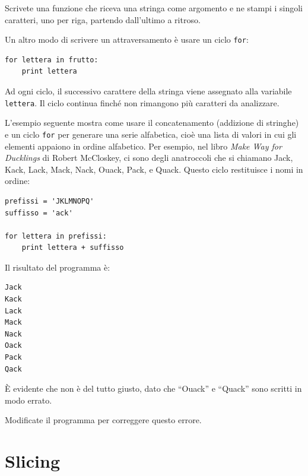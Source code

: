 \documentclass[10pt]{book}
\begin{document}
\vspace{0.2in}
\begin{exercise}

Scrivete una funzione che riceva una stringa come argomento e ne stampi i singoli caratteri, uno per riga, partendo dall'ultimo a ritroso.

\end{exercise}

Un altro modo di scrivere un attraversamento è usare un ciclo {\tt for}:

\begin{verbatim}
for lettera in frutto:
    print lettera
\end{verbatim}
%
Ad ogni ciclo, il successivo carattere della stringa viene assegnato alla variabile {\tt lettera}. Il ciclo continua finché non rimangono più caratteri da analizzare.

L'esempio seguente mostra come usare il concatenamento (addizione di stringhe) e un ciclo {\tt for} per generare una serie alfabetica, cioè una lista di valori in cui gli elementi appaiono in ordine alfabetico. Per esempio, nel libro {\em Make Way for Ducklings} di Robert McCloskey, ci sono degli anatroccoli che si chiamano Jack, Kack, Lack, Mack, Nack, Ouack, Pack, e Quack.  Questo ciclo restituisce i nomi in ordine:

\begin{verbatim}
prefissi = 'JKLMNOPQ'
suffisso = 'ack'

for lettera in prefissi:
    print lettera + suffisso
\end{verbatim}
%
Il risultato del programma è:

\begin{verbatim}
Jack
Kack
Lack
Mack
Nack
Oack
Pack
Qack
\end{verbatim}
%
È evidente che non è del tutto giusto, dato che ``Ouack'' e ``Quack'' sono scritti in modo errato.

\vspace{0.2in}
\begin{exercise}

Modificate il programma per correggere questo errore.

\end{exercise}



\section{Slicing}
\label{slice}
\end{document}
